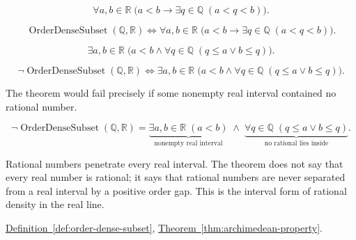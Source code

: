 \begin{remark*}
\[
\forall a,b\in\mathbb{R}\;\bigl(a<b\rightarrow \exists q\in\mathbb{Q}\;(a<q<b)\bigr).
\]
\end{remark*}

\begin{remark*}
\[
\operatorname{OrderDenseSubset}(\mathbb{Q},\mathbb{R})\Longleftrightarrow
\forall a,b\in\mathbb{R}\;\bigl(a<b\rightarrow \exists q\in\mathbb{Q}\;(a<q<b)\bigr).
\]
\end{remark*}

\begin{remark*}
\[
\exists a,b\in\mathbb{R}\;\bigl(a<b\land \forall q\in\mathbb{Q}\;(q\le a\lor b\le q)\bigr).
\]
\end{remark*}

\begin{remark*}
\[
\neg\operatorname{OrderDenseSubset}(\mathbb{Q},\mathbb{R})\Longleftrightarrow
\exists a,b\in\mathbb{R}\;\bigl(a<b\land \forall q\in\mathbb{Q}\;(q\le a\lor b\le q)\bigr).
\]
\end{remark*}

\begin{remark*}
The theorem would fail precisely if some nonempty real interval contained no rational number.
\end{remark*}

\begin{remark*}
\[
\neg\operatorname{OrderDenseSubset}(\mathbb{Q},\mathbb{R})
=
\underbrace{\exists a,b\in\mathbb{R}\;(a<b)}_{\text{nonempty real interval}}
\;\land\;
\underbrace{\forall q\in\mathbb{Q}\;(q\le a\lor b\le q)}_{\text{no rational lies inside}}.
\]
\end{remark*}

\begin{remark*}[Interpretation]
Rational numbers penetrate every real interval. The theorem does not say that every real number is rational; it says that rational numbers are never separated from a real interval by a positive order gap. This is the interval form of rational density in the real line.
\end{remark*}

\begin{dependencies}
\hyperref[def:order-dense-subset]{Definition~\ref*{def:order-dense-subset}},
\hyperref[thm:archimedean-property]{Theorem~\ref*{thm:archimedean-property}}.
\end{dependencies}








